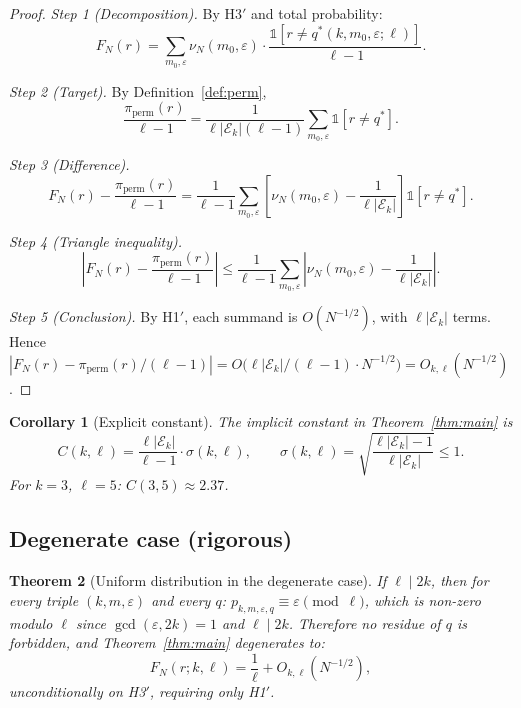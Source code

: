 \documentclass[11pt,a4paper]{article}
\theoremstyle{plain}
\newtheorem{theorem}{Theorem}[section]
\newtheorem{corollary}[theorem]{Corollary}
\theoremstyle{definition}
\newcommand{\PiP}{\pi_{\mathrm{perm}}}
\newcommand{\eps}{\varepsilon}
\newcommand{\Eclass}{\mathcal{E}}
\begin{document}
\begin{proof}
\emph{Step 1 (Decomposition).} By H3$'$ and total probability:
\[
F_N(r) = \sum_{m_0, \eps} \nu_N(m_0, \eps) \cdot
\frac{\mathbb{1}[r \neq q^*(k, m_0, \eps; \ell)]}{\ell - 1}.
\]

\emph{Step 2 (Target).} By Definition~\ref{def:perm},
\[
\frac{\PiP(r)}{\ell - 1}
= \frac{1}{\ell |\Eclass_k| (\ell - 1)} \sum_{m_0, \eps} \mathbb{1}[r \neq q^*].
\]

\emph{Step 3 (Difference).}
\[
F_N(r) - \frac{\PiP(r)}{\ell - 1}
= \frac{1}{\ell - 1} \sum_{m_0, \eps} \left[\nu_N(m_0, \eps) - \frac{1}{\ell |\Eclass_k|}\right]
\mathbb{1}[r \neq q^*].
\]

\emph{Step 4 (Triangle inequality).}
\[
\left|F_N(r) - \frac{\PiP(r)}{\ell - 1}\right|
\le \frac{1}{\ell - 1} \sum_{m_0, \eps} \left|\nu_N(m_0, \eps) - \frac{1}{\ell |\Eclass_k|}\right|.
\]

\emph{Step 5 (Conclusion).} By H1$'$, each summand is $O(N^{-1/2})$, with
$\ell |\Eclass_k|$ terms. Hence
$\left|F_N(r) - \PiP(r)/(\ell-1)\right| = O\bigl(\ell |\Eclass_k|/(\ell-1) \cdot N^{-1/2}\bigr)
= O_{k, \ell}(N^{-1/2})$.
\end{proof}

\begin{corollary}[Explicit constant]\label{cor:constant}
The implicit constant in Theorem~\ref{thm:main} is
\[
C(k, \ell) = \frac{\ell |\Eclass_k|}{\ell - 1} \cdot \sigma(k, \ell), \qquad
\sigma(k, \ell) = \sqrt{\frac{\ell |\Eclass_k| - 1}{\ell |\Eclass_k|}} \le 1.
\]
For $k = 3$, $\ell = 5$: $C(3, 5) \approx 2.37$.
\end{corollary}

\subsection{Degenerate case (rigorous)}

\begin{rigorousbox}
\begin{theorem}[Uniform distribution in the degenerate case]\label{thm:degenerate}
If $\ell \mid 2k$, then for every triple $(k, m, \eps)$ and every $q$:
$p_{k, m, \eps, q} \equiv \eps \pmod \ell$, which is non-zero modulo $\ell$ since
$\gcd(\eps, 2k) = 1$ and $\ell \mid 2k$. Therefore no residue of $q$ is forbidden,
and Theorem~\ref{thm:main} degenerates to:
\[
F_N(r; k, \ell) = \frac{1}{\ell} + O_{k, \ell}(N^{-1/2}),
\]
\emph{unconditionally on H3$'$, requiring only H1$'$.}
\end{theorem}
\end{rigorousbox}
\end{document}
